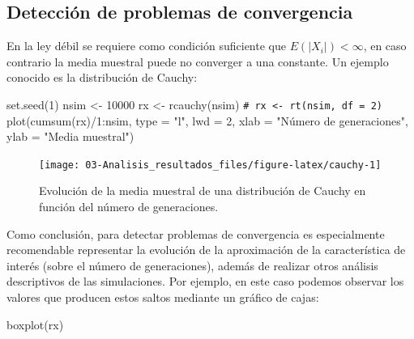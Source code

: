 \documentclass[
]{book}
\newenvironment{Shaded}{\begin{snugshade}}{\end{snugshade}}
\newcommand{\AttributeTok}[1]{\textcolor[rgb]{0.77,0.63,0.00}{#1}}
\newcommand{\CommentTok}[1]{\textcolor[rgb]{0.56,0.35,0.01}{\textit{#1}}}
\newcommand{\DecValTok}[1]{\textcolor[rgb]{0.00,0.00,0.81}{#1}}
\newcommand{\FunctionTok}[1]{\textcolor[rgb]{0.00,0.00,0.00}{#1}}
\newcommand{\NormalTok}[1]{#1}
\newcommand{\OtherTok}[1]{\textcolor[rgb]{0.56,0.35,0.01}{#1}}
\newcommand{\SpecialCharTok}[1]{\textcolor[rgb]{0.00,0.00,0.00}{#1}}
\newcommand{\StringTok}[1]{\textcolor[rgb]{0.31,0.60,0.02}{#1}}
\theoremstyle{break}
\theoremstyle{nonumberplain}
\renewcommand{\CommentTok}[1]{\textcolor[rgb]{0.41,0.41,0.41}{\texttt{#1}}}
\begin{document}
\hypertarget{detecciuxf3n-de-problemas-de-convergencia}{%
\subsection{Detección de problemas de convergencia}\label{detecciuxf3n-de-problemas-de-convergencia}}

En la ley débil se requiere como condición suficiente que \(E\left( \left\vert X_{i} \right\vert \right) < \infty\), en caso contrario la media muestral puede no converger a una constante.
Un ejemplo conocido es la distribución de Cauchy:

\begin{Shaded}
\begin{Highlighting}[]
\FunctionTok{set.seed}\NormalTok{(}\DecValTok{1}\NormalTok{)}
\NormalTok{nsim }\OtherTok{\textless{}{-}} \DecValTok{10000}
\NormalTok{rx }\OtherTok{\textless{}{-}} \FunctionTok{rcauchy}\NormalTok{(nsim) }\CommentTok{\# rx \textless{}{-} rt(nsim, df = 2)}
\FunctionTok{plot}\NormalTok{(}\FunctionTok{cumsum}\NormalTok{(rx)}\SpecialCharTok{/}\DecValTok{1}\SpecialCharTok{:}\NormalTok{nsim, }\AttributeTok{type =} \StringTok{"l"}\NormalTok{, }\AttributeTok{lwd =} \DecValTok{2}\NormalTok{, }
     \AttributeTok{xlab =} \StringTok{"Número de generaciones"}\NormalTok{, }\AttributeTok{ylab =} \StringTok{"Media muestral"}\NormalTok{)}
\end{Highlighting}
\end{Shaded}

\begin{figure}[!htb]

{\centering \texttt{[image: 03-Analisis\_resultados\_files/figure-latex/cauchy-1]} 

}

\caption{Evolución de la media muestral de una distribución de Cauchy en función del número de generaciones.}\label{fig:cauchy}
\end{figure}

Como conclusión, para detectar problemas de convergencia es especialmente recomendable representar la evolución de la aproximación de la característica de interés (sobre el número de generaciones),
además de realizar otros análisis descriptivos de las simulaciones.
Por ejemplo, en este caso podemos observar los valores que producen estos saltos mediante un gráfico de cajas:

\begin{Shaded}
\begin{Highlighting}[]
\FunctionTok{boxplot}\NormalTok{(rx)}
\end{Highlighting}
\end{Shaded}
\end{document}
